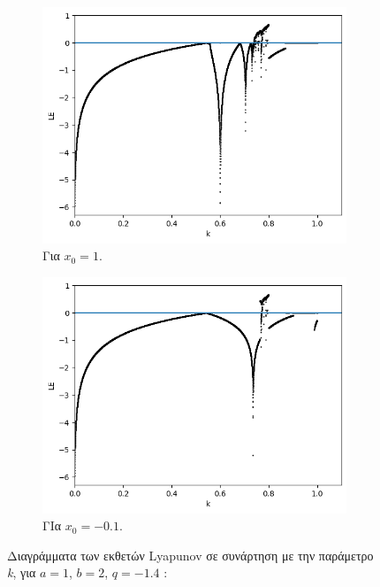 \begin{figure}[h!]
\begin{subfigure}[b]{0.45\textwidth}
		\centering
		\includegraphics[width=\textwidth]{LateX images/graphs q14/g8}
		\caption{Για \(x_0=1\).}
		\label{f:g25}
	\end{subfigure}
	\hfill
	\begin{subfigure}[b]{0.45\textwidth}
		\centering
		\includegraphics[width=\textwidth]{LateX images/graphs q14/g9}
		\caption{ΓΙα \(x_0=-0.1\).}
		\label{f:g26}
	\end{subfigure}
	\hfill
	\caption{ Διαγράμματα των εκθετών Lyapunov σε συνάρτηση με την παράμετρο \emph{k}, για $a = 1$, $b = 2$, $q=-1.4$ :}
	\label{f:g233}
\end{figure}


